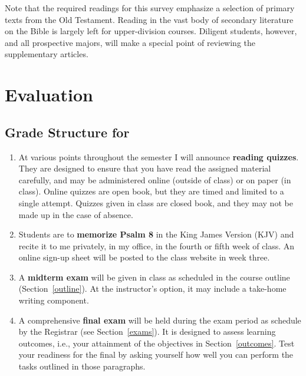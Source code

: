\documentclass[titlepage]{article}
\begin{document}
Note that the required readings for this survey emphasize a selection of
primary texts from the Old Testament. Reading in the vast body of
secondary literature on the Bible is largely left for upper-division
courses. Diligent students, however, and all prospective majors, will
make a special point of reviewing the supplementary articles.

\section{Evaluation}
\label{evaluation}

\subsection{Grade Structure for \ccode}
\label{structure}

\begin{enumerate}

	\item At various points throughout the semester I will announce
	\textbf{reading quizzes}. They are designed to ensure that you have
	read the assigned material carefully, and may be administered online
	(outside of class) or on paper (in class). Online quizzes are open
	book, but they are timed and limited to a single attempt. Quizzes
	given in class are closed book, and they may not be made up in the
	case of absence.

	\item Students are to \textbf{memorize Psalm 8} in the King James
	Version (KJV) and recite it to me privately, in my office, in the
	fourth or fifth week of class. An online sign-up sheet will be
	posted to the class website in week three.

	\item A \textbf{midterm exam} will be given in class as scheduled in
	the course outline (Section~\ref{outline}). At the instructor's
	option, it may include a take-home writing component.

	\item A comprehensive \textbf{final exam} will be held during the
	exam period as schedule by the Registrar (see Section~\ref{exams}).
	It is designed to assess learning outcomes, i.e., your attainment of
	the objectives in Section~\ref{outcomes}. Test your readiness for
	the final by asking yourself how well you can perform the tasks
	outlined in those paragraphs.

\end{enumerate}
\end{document}
